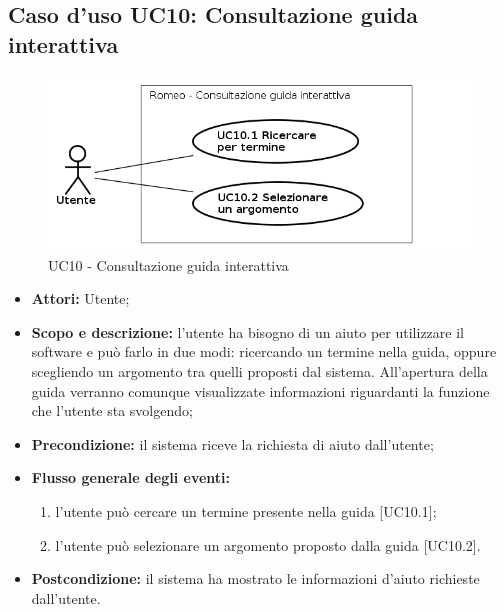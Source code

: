 \subsection{Caso d'uso UC10: Consultazione guida interattiva}
\begin{figure}[!h]
\begin{center}
\includegraphics[scale=0.6]{./img/Use_Case/UC10}
\caption{UC10 - Consultazione guida interattiva}
\end{center}
\end{figure}
\begin{itemize}
\item \textbf{Attori:} Utente;
\item \textbf{Scopo e descrizione:} l'utente ha bisogno di un aiuto per utilizzare il software e può farlo in due modi: ricercando un termine nella guida, oppure scegliendo un argomento tra quelli proposti dal sistema. All'apertura della guida verranno comunque visualizzate informazioni riguardanti la funzione che l'utente sta svolgendo;
\item \textbf{Precondizione:} il sistema riceve la richiesta di aiuto dall'utente;
\item \textbf{Flusso generale degli eventi:}
\begin{enumerate}
\item l'utente può cercare un termine presente nella guida [UC10.1];
\item l'utente può selezionare un argomento proposto dalla guida [UC10.2].
\end{enumerate}
\item \textbf{Postcondizione:} il sistema ha mostrato le informazioni d'aiuto richieste dall'utente.
\end{itemize}

